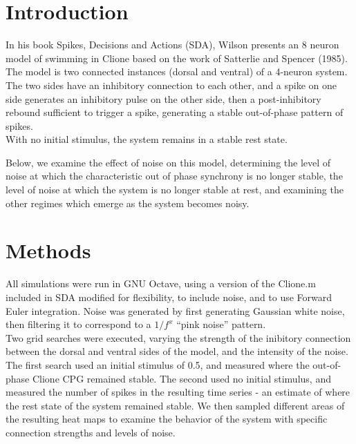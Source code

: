 \documentclass{article}
\title{\cTitle}
\author{\cAuthor}
\begin{document}
\maketitle

\section*{Introduction}
In his book Spikes, Decisions and Actions (SDA), Wilson presents an 8 neuron
model of swimming in Clione based on the work of Satterlie and Spencer (1985).
The model is two connected instances (dorsal and ventral) of a 4-neuron system.
The two sides have an inhibitory connection to each other, and a spike on one side
generates an inhibitory pulse on the other side, then a post-inhibitory rebound
sufficient to trigger a spike, generating a stable out-of-phase pattern of spikes.\\

\scalebox{0.6}{}
With no initial stimulus, the system remains in a stable rest state.\\
\scalebox{0.6}{}


Below, we examine the effect of noise on this model, determining the 
level of noise at which the characteristic out of phase synchrony is no longer stable,
the level of noise at which the system is no longer stable at rest,
and examining the other regimes which emerge as the system becomes noisy.

\section*{Methods}
All simulations were run in GNU Octave, using a version of the Clione.m included
in SDA modified for flexibility, to include noise, and to use Forward Euler integration.
Noise was generated by first generating Gaussian white noise, then filtering it to 
correspond to a $1/f^x$ ``pink noise'' pattern.\\
\scalebox{0.6}{}
Two grid searches were executed, varying the strength of the inibitory connection between
the dorsal and ventral sides of the model, and the intensity of the noise.
The first search used an initial stimulus of 0.5, and measured where the out-of-phase Clione
CPG remained stable.  The second used no initial stimulus, and measured the number of spikes
in the resulting time series - an estimate of where the rest state of the system remained stable.
We then sampled different areas of the resulting heat maps to examine the behavior of the system
with specific connection strengths and levels of noise.
\end{document}
